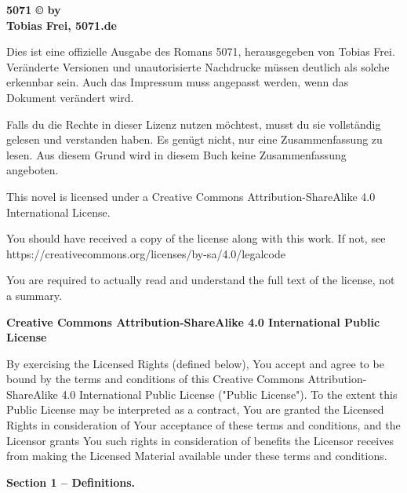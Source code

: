 \textbf{5071 © by\\ Tobias Frei, 5071.de}

Dies ist eine offizielle Ausgabe des Romans 5071, herausgegeben von Tobias Frei. Veränderte Versionen und unautorisierte Nachdrucke müssen deutlich als solche erkennbar sein. Auch das Impressum muss angepasst werden, wenn das Dokument verändert wird.

Falls du die Rechte in dieser Lizenz nutzen möchtest, musst du sie vollständig gelesen und verstanden haben. Es genügt nicht, nur eine Zusammenfassung zu lesen. Aus diesem Grund wird in diesem Buch keine Zusammenfassung angeboten.

This novel is licensed under a Creative Commons Attribution-ShareAlike 4.0 International License.

You should have received a copy of the license along with this work. If not, see\\
https://creativecommons.org/licenses/by-sa/4.0/legalcode

You are required to actually read and understand the full text of the license, not a summary.

\begin{center}
    \large{\textbf{Creative Commons Attribution-ShareAlike 4.0 International Public License}}
\end{center}

By exercising the Licensed Rights (defined below), You accept and agree to be bound by the terms and conditions of this Creative Commons Attribution-ShareAlike 4.0 International Public License ("Public License"). To the extent this Public License may be interpreted as a contract, You are granted the Licensed Rights in consideration of Your acceptance of these terms and conditions, and the Licensor grants You such rights in consideration of benefits the Licensor receives from making the Licensed Material available under these terms and conditions.

\begin{center}
    \textbf{Section 1 -- Definitions.}
\end{center}

